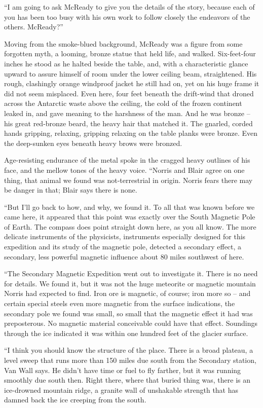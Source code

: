 \documentclass[letterpaper,openany,12pt]{memoir}		%
\begin{document}
``I am going to ask McReady to give you the details of the story, because each
of you has been too busy with his own work to follow closely the endeavors of
the others. McReady?''

Moving from the smoke-blued background, McReady was a figure from some forgotten
myth, a looming, bronze statue that held life, and walked. Six-feet-four inches
he stood as he halted beside the table, and, with a characteristic glance upward
to assure himself of room under the lower ceiling beam, straightened. His rough,
clashingly orange windproof jacket he still had on, yet on his huge frame it did
not seem misplaced. Even here, four feet beneath the drift-wind that droned
across the Antarctic waste above the ceiling, the cold of the frozen continent
leaked in, and gave meaning to the harshness of the man. And he was bronze -- his
great red-bronze beard, the heavy hair that matched it. The gnarled, corded
hands gripping, relaxing, gripping relaxing on the table planks were bronze.
Even the deep-sunken eyes beneath heavy brows were bronzed.

Age-resisting endurance of the metal spoke in the cragged heavy outlines of his
face, and the mellow tones of the heavy voice. ``Norris and Blair agree on one
thing, that animal we found was not-terrestrial in origin. Norris fears there
may be danger in that; Blair says there is none.

``But I'll go back to how, and why, we found it. To all that was known before we
came here, it appeared that this point was exactly over the South Magnetic Pole
of Earth. The compass does point straight down here, as you all know. The more
delicate instruments of the physicists, instruments especially designed for this
expedition and its study of the magnetic pole, detected a secondary effect, a
secondary, less powerful magnetic influence about 80 miles southwest of here.

``The Secondary Magnetic Expedition went out to investigate it. There is no need
for details. We found it, but it was not the huge meteorite or magnetic mountain
Norris had expected to find. Iron ore is magnetic, of course; iron more so --
and certain special steels even more magnetic from the surface indications, the
secondary pole we found was small, so small that the magnetic effect it had was
preposterous. No magnetic material conceivable could have that effect. Soundings
through the ice indicated it was within one hundred feet of the glacier surface.

``I think you should know the structure of the place. There is a broad plateau,
a level sweep that runs more than 150 miles due south from the Secondary
station, Van Wall says. He didn't have time or fuel to fly farther, but it was
running smoothly due south then. Right there, where that buried thing was, there
is an ice-drowned mountain ridge, a granite wall of unshakable strength that has
damned back the ice creeping from the south.
\end{document}
